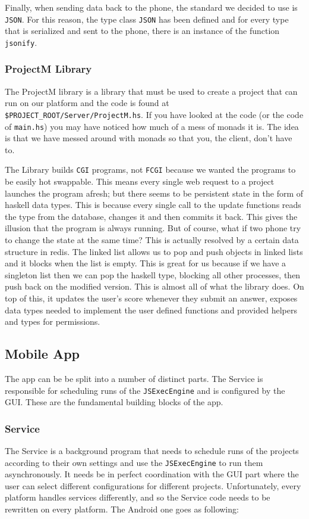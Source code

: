 \documentclass{article}
\begin{document}
Finally, when sending data back to the phone, the standard we decided to use is \texttt{JSON}. For this reason, the type class \texttt{JSON}
has been defined and for every type that is serialized and sent to the phone, there is an instance of the function \texttt{jsonify}.

\subsubsection{ProjectM Library}
The ProjectM library is a library that must be used to create a project that can run on our platform and the code is found at
\texttt{\$PROJECT\_ROOT/Server/ProjectM.hs}. If you have looked at the code (or the code of \texttt{main.hs}) you may have noticed
how much of a mess of monads it is. The idea is that we have messed around with monads so that you, the client, don't have to.

The Library builds \texttt{CGI} programs, not \texttt{FCGI} because we wanted the programs to be easily hot swappable. This means
every single web request to a project launches the program afresh; but there seems to be persistent state in the form of haskell
data types. This is because every single call to the update functions reads the type from the database, changes it and then commits it
back. This gives the illusion that the program is always running. But of course, what if two phone try to change the state at the same time?
This is actually resolved by a certain data structure in redis. The linked list allows us to pop and push objects in linked lists and it blocks
when the list is empty. This is great for us because if we have a singleton list then we can pop the haskell type, blocking all other
processes, then push back on the modified version. This is almost all of what the library does. On top of this, it updates the user's
score whenever they submit an answer, exposes data types needed to implement the user defined functions and provided helpers
and types for permissions.

\subsection{Mobile App}
The app can be be split into a number of distinct parts. The Service is responsible for scheduling runs of the \texttt{JSExecEngine} and is
configured by the GUI. These are the fundamental building blocks of the app.

\subsubsection{Service}
The Service is a background program that needs to schedule runs of the projects according to their own settings and use the \texttt{JSExecEngine} to run them asynchronously. It needs be in perfect coordination with the GUI part where the user can select different configurations for different projects. Unfortunately, every platform handles services differently, and so the Service code needs to be rewritten on every platform. The Android one goes as following:
\end{document}
